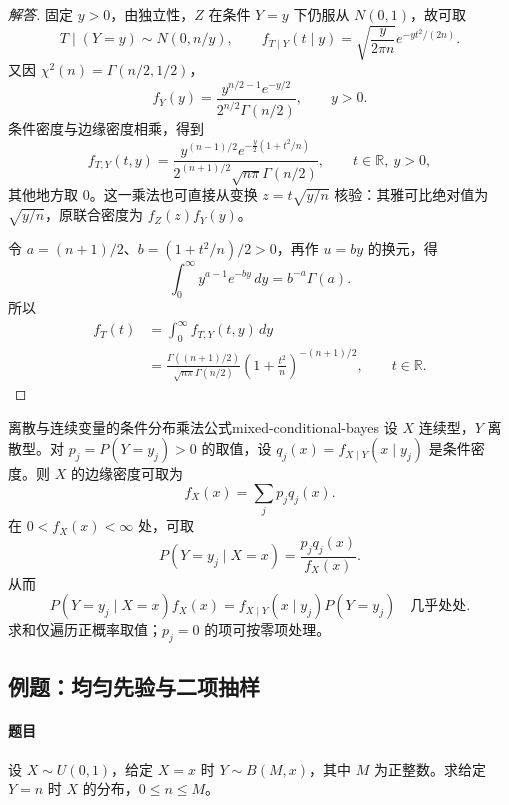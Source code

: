\begin{proof}[解答]
固定 $y>0$，由独立性，$Z$ 在条件 $Y=y$ 下仍服从 $N(0,1)$，故可取
\[
T\mid(Y=y)\sim N(0,n/y),\qquad
f_{T\mid Y}(t\mid y)=\sqrt{\frac{y}{2\pi n}}e^{-yt^2/(2n)}.
\]
又因 $\chi^2(n)=\Gamma(n/2,1/2)$，
\[
f_Y(y)=\frac{y^{n/2-1}e^{-y/2}}{2^{n/2}\Gamma(n/2)},\qquad y>0.
\]
条件密度与边缘密度相乘，得到
\[
f_{T,Y}(t,y)=
\frac{y^{(n-1)/2}e^{-\frac y2(1+t^2/n)}}
 {2^{(n+1)/2}\sqrt{n\pi}\Gamma(n/2)},
\qquad t\in\mathbb R,\ y>0,
\]
其他地方取 $0$。这一乘法也可直接从变换 $z=t\sqrt{y/n}$ 核验：其雅可比绝对值为 $\sqrt{y/n}$，原联合密度为 $f_Z(z)f_Y(y)$。

令 $a=(n+1)/2$、$b=(1+t^2/n)/2>0$，再作 $u=by$ 的换元，得
\[
\int_0^\infty y^{a-1}e^{-by}\,dy=b^{-a}\Gamma(a).
\]
所以
\begin{align*}
f_T(t)
&=\int_0^\infty f_{T,Y}(t,y)\,dy\\
&=\frac{\Gamma((n+1)/2)}{\sqrt{n\pi}\Gamma(n/2)}
 \left(1+\frac{t^2}n\right)^{-(n+1)/2},
\qquad t\in\mathbb R.
\end{align*}
\end{proof}

\begin{proposition}{离散与连续变量的条件分布乘法公式}{mixed-conditional-bayes}
设 $X$ 连续型，$Y$ 离散型。对 $p_j=P(Y=y_j)>0$ 的取值，设 $q_j(x)=f_{X\mid Y}(x\mid y_j)$ 是条件密度。则 $X$ 的边缘密度可取为
\[
f_X(x)=\sum_jp_jq_j(x).
\]
在 $0<f_X(x)<\infty$ 处，可取
\[
P(Y=y_j\mid X=x)=\frac{p_jq_j(x)}{f_X(x)}.
\]
从而
\[
P(Y=y_j\mid X=x)f_X(x)
=f_{X\mid Y}(x\mid y_j)P(Y=y_j)
\quad\text{几乎处处}.
\]
求和仅遍历正概率取值；$p_j=0$ 的项可按零项处理。
\end{proposition}

\subsection{例题：均匀先验与二项抽样}\label{note:c3:e14}
\paragraph{题目}
设 $X\sim U(0,1)$，给定 $X=x$ 时 $Y\sim B(M,x)$，其中 $M$ 为正整数。求给定 $Y=n$ 时 $X$ 的分布，$0\leq n\leq M$。

